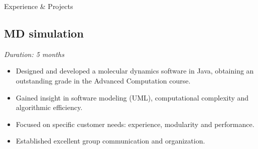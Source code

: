 \documentclass{resume}
\begin{document}
\begin{rSection}{\large{Experience \& Projects {\href{https://github.com/aritzLizoain}{}}}}
\begin{adjustwidth}{-6mm}{0pt}
\subsection*{MD simulation}
\vspace{-8pt}
\textit{Duration: 5 months}
\end{adjustwidth}
\begin{adjustwidth}{-3.5mm}{0pt}
\begin{itemize}
    \item Designed and developed a molecular dynamics software in Java, obtaining an outstanding grade in the Advanced Computation course.
    \item Gained insight in software modeling (UML), computational complexity and algorithmic efficiency.
    \item Focused on specific customer needs: experience, modularity and performance.
    \item Established excellent group communication and organization.
\end{itemize}
\end{adjustwidth}
\end{rSection}
\end{document}
